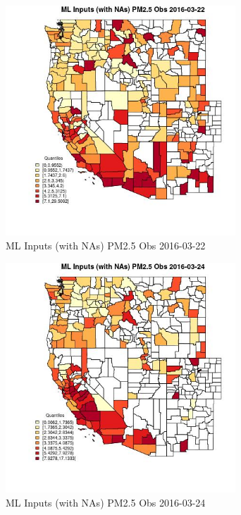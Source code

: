 \begin{figure} 
\centering  
\includegraphics[width=0.77\textwidth]{Code_Outputs/Report_ML_input_PM25_Step4_part_e_de_duplicated_aveswNAs_CountyPM25_ObsMean2016-03-22_2016-03-22.jpg} 
\caption{\label{fig:Report_ML_input_PM25_Step4_part_e_de_duplicated_aveswNAsCountyPM25_ObsMean2016-03-22_2016-03-22}ML Inputs (with NAs) PM2.5 Obs 2016-03-22} 
\end{figure} 
 

\begin{figure} 
\centering  
\includegraphics[width=0.77\textwidth]{Code_Outputs/Report_ML_input_PM25_Step4_part_e_de_duplicated_aveswNAs_CountyPM25_ObsMean2016-03-24_2016-03-24.jpg} 
\caption{\label{fig:Report_ML_input_PM25_Step4_part_e_de_duplicated_aveswNAsCountyPM25_ObsMean2016-03-24_2016-03-24}ML Inputs (with NAs) PM2.5 Obs 2016-03-24} 
\end{figure} 
 

